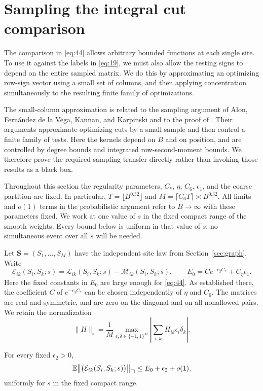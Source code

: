 \section{Sampling the integral cut comparison}
\label{sec:sampling}

The comparison in \eqref{eq:44} allows arbitrary bounded functions at
each single site.  To use it against the labels in \eqref{eq:19}, we
must also allow the testing signs to depend on the entire sampled
matrix.  We do this by approximating an optimizing row-sign vector
using a small set of columns, and then applying concentration
simultaneously to the resulting finite family of optimizations.

The small-column approximation is related to the sampling argument of
Alon, Fern\'andez de la Vega, Kannan, and Karpinski
\citep[Lemma~3]{AlonEtAl2003Sampling} and to the proof of
\citet[Theorem~4.6]{BorgsEtAl2008}. Their arguments approximate optimizing
cuts by a small sample and then control a finite family of tests.
Here the kernels depend on $B$ and on position, and are controlled by
degree bounds and integrated row-second-moment bounds. We therefore
prove the required sampling transfer directly rather than invoking those
results as a black box.

Throughout this section the regularity parameters, $C_*$, $\eta$,
$C_6$, $\epsilon_1$, and the coarse partition are fixed.  In particular,
$T=\lfloor B^{0.32}\rfloor$ and $M=\lceil C_6T\rceil\asymp B^{0.32}$.
All limits and $o(1)$ terms in the probabilistic argument refer to
$B\to\infty$ with these parameters fixed.  We work at one value of $s$
in the fixed compact range of the smooth weights.  Every bound below
is uniform in that value of $s$; no simultaneous event over all $s$
will be needed.

Let $\mathbf S=(S_1,\ldots,S_M)$ have the independent site law from
Section~\ref{sec:graph}.  Write
\[
 \mathcal E_{ik}(S_i,S_k;s)
   =\mathcal L_{ik}(S_i,S_k;s)-\mathcal M_{ik}(S_i,S_k;s),
 \qquad
 E_0=C e^{-c_3C_*}+C_\eta\epsilon_1.
\]
Here the fixed constants in $E_0$ are large enough for
\eqref{eq:44}.  As established there, the coefficient $C$ of
$e^{-c_3C_*}$ can be chosen independently of $\eta$ and $C_6$.
The matrices are real and symmetric, and are zero on the diagonal
and on all nonallowed pairs.  We retain the normalization
\[
 \|H\|_\square
 =\frac1M\max_{\epsilon,\delta\in\{-1,1\}^M}
       \left|\sum_{i,k}H_{ik}\epsilon_i\delta_k\right|.
\]

\begin{proposition}
\label{prop:sampling-comparison}
For every fixed $\epsilon_2>0$,
\begin{equation}
 \mathbb E\big\|\big(\mathcal E_{ik}(S_i,S_k;s)\big)\big\|_\square
       \le E_0+\epsilon_2+o(1),
 \label{eq:45}
\end{equation}
uniformly for $s$ in the fixed compact range.
\end{proposition}

